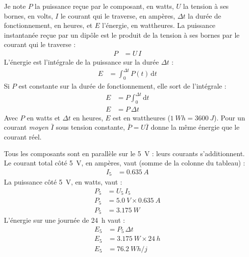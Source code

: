 \begin{demonstration}
Je note $P$ la puissance reçue par le composant, en watts, $U$ la tension à ses bornes, en volts, $I$ le courant qui le traverse, en ampères, $\Delta t$ la durée de fonctionnement, en heures, et $E$ l'énergie, en wattheures. La puissance instantanée reçue par un dipôle est le produit de la tension à ses bornes par le courant qui le traverse :
\begin{align*}
P &= U\, I
\end{align*}
L'énergie est l'intégrale de la puissance sur la durée $\Delta t$ :
\begin{align*}
E &= \int_{0}^{\Delta t} P(t)\,\mathrm{d}t
\end{align*}
Si $P$ est constante sur la durée de fonctionnement, elle sort de l'intégrale :
\begin{align*}
E &= P \int_{0}^{\Delta t} \mathrm{d}t\\
E &= P\,\Delta t
\end{align*}
Avec $P$ en watts et $\Delta t$ en heures, $E$ est en wattheures ($\qty{1}{Wh} = \qty{3600}{J}$). Pour un courant \emph{moyen} $\bar I$ sous tension constante, $\bar P = U \bar I$ donne la même énergie que le courant réel.
\end{demonstration}

\begin{demonstration}
Tous les composants sont en parallèle sur le \qty{5}{V} : leurs courants s'additionnent. Le courant total côté \qty{5}{V}, en ampères, vaut (somme de la colonne du tableau) :
\begin{align*}
I_5 &= \qty{0,635}{A}
\end{align*}
La puissance côté \qty{5}{V}, en watts, vaut :
\begin{align*}
P_5 &= U_5\, I_5\\
P_5 &= \qty{5,0}{V} \times \qty{0,635}{A}\\
P_5 &= \qty{3,175}{W}
\end{align*}
L'énergie sur une journée de \qty{24}{h} vaut :
\begin{align*}
E_5 &= P_5\,\Delta t\\
E_5 &= \qty{3,175}{W} \times \qty{24}{h}\\
E_5 &= \qty{76,2}{Wh/j}
\end{align*}
\end{demonstration}

